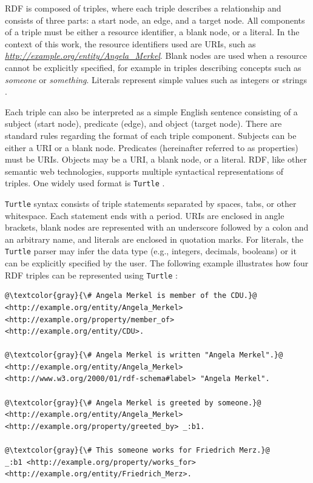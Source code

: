 \documentclass[a4paper,oneside,bibliography=totoc]{scrbook}
\begin{document}
\Ac{RDF} is composed of triples, where each triple describes a relationship and consists of three parts: a start node, an edge, and a target node. All components of a triple must be either a resource identifier, a blank node, or a literal. In the context of this work, the resource identifiers used are \acp{URI}, such as \textit{\url{http://example.org/entity/Angela_Merkel}}. Blank nodes are used when a resource cannot be explicitly specified, for example in triples describing concepts such as \textit{someone} or \textit{something}. Literals represent simple values such as integers or strings \cite{VillazonTerrazas2017a}.

Each triple can also be interpreted as a simple English sentence consisting of a subject (start node), predicate (edge), and object (target node). There are standard rules regarding the format of each triple component. Subjects can be either a \ac{URI} or a blank node. Predicates (hereinafter referred to as properties) must be \acp{URI}. Objects may be a \ac{URI}, a blank node, or a literal. RDF, like other semantic web technologies, supports multiple syntactical representations of triples. One widely used format is \texttt{Turtle} \cite{VillazonTerrazas2017}.

\texttt{Turtle} syntax consists of triple statements separated by spaces, tabs, or other whitespace. Each statement ends with a period. \acp{URI} are enclosed in angle brackets, blank nodes are represented with an underscore followed by a colon and an arbitrary name, and literals are enclosed in quotation marks. For literals, the \texttt{Turtle} parser may infer the data type (e.g., integers, decimals, booleans) or it can be explicitly specified by the user. The following example illustrates how four RDF triples can be represented using \texttt{Turtle} \cite{Tomaszuk2020}:

\begin{lstlisting}[language=Turtle, caption=Example of a Knowledge Graph in \texttt{Turtle} Format, label=lst:turtle_example, escapechar=@]
@\textcolor{gray}{\# Angela Merkel is member of the CDU.}@
<http://example.org/entity/Angela_Merkel> <http://example.org/property/member_of> <http://example.org/entity/CDU>.

@\textcolor{gray}{\# Angela Merkel is written "Angela Merkel".}@
<http://example.org/entity/Angela_Merkel> <http://www.w3.org/2000/01/rdf-schema#label> "Angela Merkel".

@\textcolor{gray}{\# Angela Merkel is greeted by someone.}@
<http://example.org/entity/Angela_Merkel> <http://example.org/property/greeted_by> _:b1.

@\textcolor{gray}{\# This someone works for Friedrich Merz.}@
_:b1 <http://example.org/property/works_for> <http://example.org/entity/Friedrich_Merz>.
\end{lstlisting}
\end{document}
